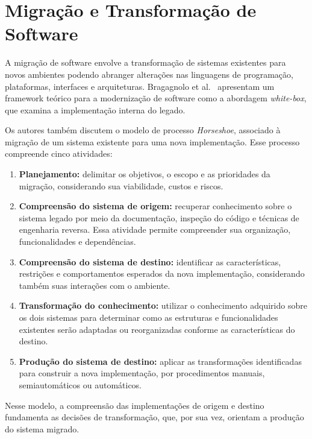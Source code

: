 \section{Migração e Transformação de Software}

A migração de software envolve a transformação de sistemas existentes para novos ambientes podendo abranger alterações nas linguagens de programação, plataformas, interfaces e arquiteturas. Bragagnolo et al.~\cite{BragagnoloMigration} apresentam um framework teórico para a modernização de software como a abordagem \textit{white-box}, que examina a implementação interna do legado.

Os autores também discutem o modelo de processo \textit{Horseshoe}, associado à migração de um sistema existente para uma nova implementação. Esse processo compreende cinco atividades:

\begin{enumerate}
    \item \textbf{Planejamento:} delimitar os objetivos, o escopo e as prioridades da migração, considerando sua viabilidade, custos e riscos.
    \item \textbf{Compreensão do sistema de origem:} recuperar conhecimento sobre o sistema legado por meio da documentação, inspeção do código e técnicas de engenharia reversa. Essa atividade permite compreender sua organização, funcionalidades e dependências.
    \item \textbf{Compreensão do sistema de destino:} identificar as características, restrições e comportamentos esperados da nova implementação, considerando também suas interações com o ambiente.
    \item \textbf{Transformação do conhecimento:} utilizar o conhecimento adquirido sobre os dois sistemas para determinar como as estruturas e funcionalidades existentes serão adaptadas ou reorganizadas conforme as características do destino.
    \item \textbf{Produção do sistema de destino:} aplicar as transformações identificadas para construir a nova implementação, por procedimentos manuais, semiautomáticos ou automáticos.
\end{enumerate}

Nesse modelo, a compreensão das implementações de origem e destino fundamenta as decisões de transformação, que, por sua vez, orientam a produção do sistema migrado.

